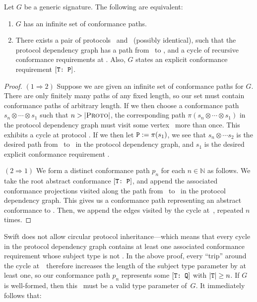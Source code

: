 \documentclass[../generics]{subfiles}
\begin{document}
\begin{proposition}
Let $G$ be a generic signature. The following are equivalent:
\begin{enumerate}
\item $G$ has an infinite set of conformance paths.
\item There exists a pair of protocols \tP\ and \tQ\ (possibly identical), such that the protocol dependency graph has a path from \tP\ to \tQ, and a cycle of recursive conformance requirements at \tQ. Also, $G$ states an explicit conformance requirement $[\texttt{T:~P}]$.
\end{enumerate}
\end{proposition}
\begin{proof}
$(1 \Rightarrow 2)$ Suppose we are given an infinite set of conformance paths for $G$. There are only finitely many paths of any fixed length, so our set must contain conformance paths of arbitrary length. If we then choose a conformance path $s_n\otimes\cdots\otimes s_1$ such that $n > |\textsc{Proto}|$, the corresponding path $\pi(s_n\otimes\cdots\otimes s_1)$ in the protocol dependency graph must visit some vertex \tQ\ more than once. This exhibits a cycle at protocol \tQ. If we then let $\texttt{P} := \pi(s_1)$, we see that $s_n\otimes\cdots s_2$ is the desired path from \tP\ to \tQ\ in the protocol dependency graph, and $s_1$ is the desired explicit conformance requirement \TP.

$(2 \Rightarrow 1)$ We form a distinct conformance path $p_n$ for each $n\in\mathbb{N}$ as follows. We take the root abstract conformance $[\texttt{T:~P}]$, and append the associated conformance projections visited along the path from \tP\ to \tQ\ in the protocol dependency graph. This gives us a conformance path representing an abstract conformance to \tQ. Then, we append the edges visited by the cycle at~\tQ, repeated $n$ times.\end{proof}

Swift does not allow circular protocol inheritance---which means that every cycle in the protocol dependency graph contains at least one associated conformance requirement whose subject type is not \tSelf. In the above proof, every ``trip'' around the cycle at~\tQ\ therefore increases the length of the subject type parameter by at least one, so our conformance path $p_n$ represents some $[\texttt{T:~Q}]$ with $|\texttt{T}|\geq n$. If $G$ is well-formed, then this \tT\ must be a valid type parameter of~$G$. It immediately follows that:
\end{document}
